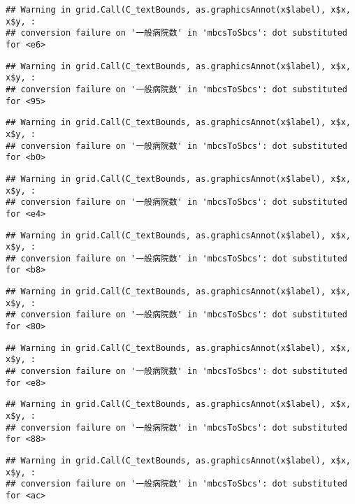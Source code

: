 \documentclass[
]{article}
\begin{document}
\begin{verbatim}
## Warning in grid.Call(C_textBounds, as.graphicsAnnot(x$label), x$x, x$y, :
## conversion failure on '一般病院数' in 'mbcsToSbcs': dot substituted for <e6>
\end{verbatim}

\begin{verbatim}
## Warning in grid.Call(C_textBounds, as.graphicsAnnot(x$label), x$x, x$y, :
## conversion failure on '一般病院数' in 'mbcsToSbcs': dot substituted for <95>
\end{verbatim}

\begin{verbatim}
## Warning in grid.Call(C_textBounds, as.graphicsAnnot(x$label), x$x, x$y, :
## conversion failure on '一般病院数' in 'mbcsToSbcs': dot substituted for <b0>
\end{verbatim}

\begin{verbatim}
## Warning in grid.Call(C_textBounds, as.graphicsAnnot(x$label), x$x, x$y, :
## conversion failure on '一般病院数' in 'mbcsToSbcs': dot substituted for <e4>
\end{verbatim}

\begin{verbatim}
## Warning in grid.Call(C_textBounds, as.graphicsAnnot(x$label), x$x, x$y, :
## conversion failure on '一般病院数' in 'mbcsToSbcs': dot substituted for <b8>
\end{verbatim}

\begin{verbatim}
## Warning in grid.Call(C_textBounds, as.graphicsAnnot(x$label), x$x, x$y, :
## conversion failure on '一般病院数' in 'mbcsToSbcs': dot substituted for <80>
\end{verbatim}

\begin{verbatim}
## Warning in grid.Call(C_textBounds, as.graphicsAnnot(x$label), x$x, x$y, :
## conversion failure on '一般病院数' in 'mbcsToSbcs': dot substituted for <e8>
\end{verbatim}

\begin{verbatim}
## Warning in grid.Call(C_textBounds, as.graphicsAnnot(x$label), x$x, x$y, :
## conversion failure on '一般病院数' in 'mbcsToSbcs': dot substituted for <88>
\end{verbatim}

\begin{verbatim}
## Warning in grid.Call(C_textBounds, as.graphicsAnnot(x$label), x$x, x$y, :
## conversion failure on '一般病院数' in 'mbcsToSbcs': dot substituted for <ac>
\end{verbatim}
\end{document}
